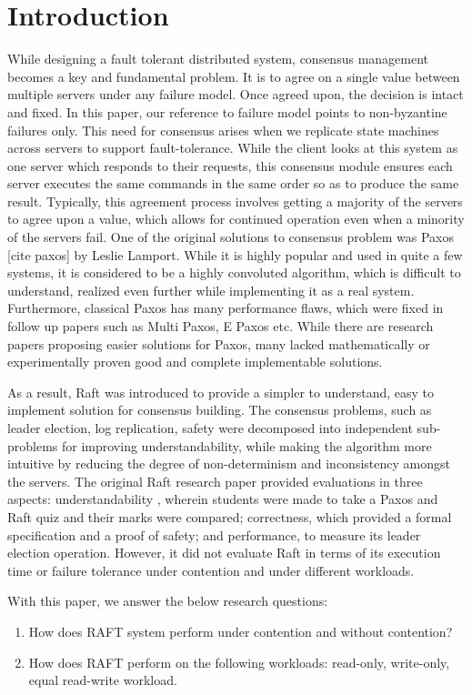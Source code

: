 \section{Introduction}
 
While designing a fault tolerant distributed system, consensus management becomes a key and fundamental problem. It is to agree on a single value between multiple servers under any failure model. Once agreed upon, the decision is intact and fixed. In this paper, our reference to failure model points to non-byzantine failures only. This need for consensus arises when we replicate state machines across servers to support fault-tolerance. While the client looks at this system as one server which responds to their requests, this consensus module ensures each server executes the same commands in the same order so as to produce the same result. Typically, this agreement process involves getting a majority of the servers to agree upon a value, which allows for continued operation even when a minority of the servers fail. One of the original solutions to consensus problem was Paxos [cite paxos] by Leslie Lamport. While it is highly popular and used in quite a few systems, it is considered to be a highly convoluted algorithm, which is difficult to understand, realized even further while implementing it as a real system. Furthermore, classical Paxos has many performance flaws, which were fixed in follow up papers such as Multi Paxos, E Paxos etc. While there are research papers proposing easier solutions for Paxos, many lacked mathematically or experimentally proven good and complete implementable solutions. 

As a result, Raft was introduced to provide a simpler to understand, easy to implement solution for consensus building. The consensus problems, such as leader election, log replication, safety were decomposed into independent sub-problems for improving understandability, while making the algorithm more intuitive by reducing the degree of non-determinism and inconsistency amongst the servers. 
The original Raft research paper provided evaluations in three aspects: understandability , wherein students were made to take a Paxos and Raft quiz and their marks were compared; correctness, which provided a formal specification and a proof of safety; and performance, to measure its leader election operation. However, it did not evaluate Raft in terms of its execution time or failure tolerance under contention and under different workloads. 

With this paper, we answer the below research questions:
\begin{enumerate}
\item How does RAFT system perform under contention and without contention?
\item How does RAFT perform on the following workloads: read-only, write-only, equal read-write workload.
\end{enumerate}

